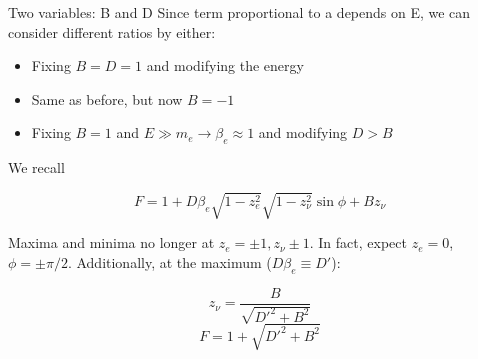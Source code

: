 \documentclass{beamer}
\begin{document}
\begin{frame}{Two variables: B and D}
	Since term proportional to a depends on E, we can consider different ratios by either:
	\begin{itemize}
		\item Fixing $B = D = 1$ and modifying the energy
		\item Same as before, but now $B = -1$
		\item Fixing $B = 1$ and $E \gg m_e \rightarrow \beta_e \approx 1$ and modifying $D > B$
	\end{itemize}
	
	We recall
	
	$$F = 1 + D\beta_e\sqrt{1-z^2_e}\sqrt{1-z^2_\nu}\sin \phi + Bz_\nu$$
	
	Maxima and minima no longer at $z_e=\pm1,z_\nu \pm1$. In fact, expect $z_e = 0$, $\phi = \pm\pi/2$. Additionally, at the maximum ($D\beta_e \equiv D'$):
	
	$$z_\nu = \frac B{\sqrt{D'^2+B^2}}$$
	$$F = 1 + \sqrt{D'^2+B^2}$$    

\end{frame}
\end{document}
